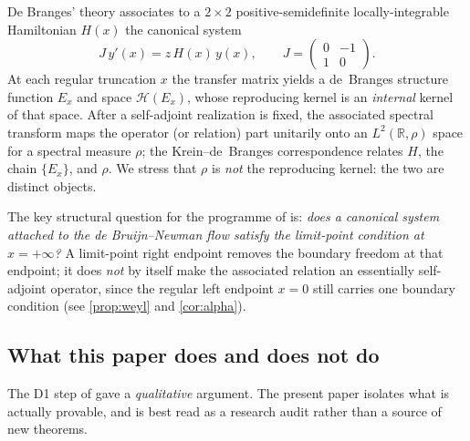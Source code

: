 \documentclass[12pt,a4paper]{amsart}
\theoremstyle{plain}
\theoremstyle{definition}
\newcommand{\R}{\mathbb{R}}
\newcommand{\Ham}{H}
\begin{document}
De Branges' theory \cite{deBranges1968} associates to a $2\times 2$
positive-semidefinite locally-integrable Hamiltonian $\Ham(x)$ the
canonical system
\begin{equation}\label{eq:cansys}
  J\,y'(x) = z\,\Ham(x)\,y(x), \qquad
  J = \begin{pmatrix} 0 & -1 \\ 1 & 0 \end{pmatrix}.
\end{equation}
At each regular truncation $x$ the transfer matrix yields a de~Branges
structure function $E_x$ and space $\mathcal H(E_x)$, whose reproducing
kernel is an \emph{internal} kernel of that space.  After a self-adjoint
realization is fixed, the associated spectral transform maps the operator
(or relation) part unitarily onto an $L^2(\R,\rho)$ space for a spectral
measure $\rho$; the Krein--de~Branges correspondence
\cite{Krein1952,Remling2018} relates $\Ham$, the chain $\{E_x\}$, and
$\rho$.  We stress that $\rho$ is \emph{not} the reproducing kernel:
the two are distinct objects.

The key structural question for the programme of \cite{SpecRoadmap} is:
\emph{does a canonical system attached to the de Bruijn--Newman flow
satisfy the limit-point condition at $x=+\infty$?}  A limit-point right
endpoint removes the boundary freedom at that endpoint; it does \emph{not}
by itself make the associated relation an essentially self-adjoint
operator, since the regular left endpoint $x=0$ still carries one boundary
condition (see \cref{prop:weyl} and \cref{cor:alpha}).

\subsection*{What this paper does and does not do}

The D1 step of \cite{SpecRoadmap} gave a \emph{qualitative} argument.
The present paper isolates what is actually provable, and is best read as
a research audit rather than a source of new theorems.
\end{document}
